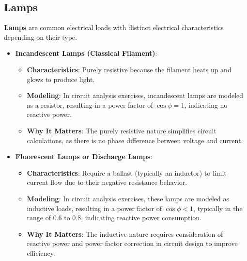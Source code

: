 \documentclass[12pt]{article}
\newcommand{\concept}[1]{\textbf{#1}}
\begin{document}
\subsection{Lamps}
\concept{Lamps} are common electrical loads with distinct electrical characteristics depending on their type.
\begin{itemize}
    \item \textbf{Incandescent Lamps (Classical Filament)}:
        \begin{itemize}
            \item \textbf{Characteristics}: Purely resistive because the filament heats up and glows to produce light.
            \item \textbf{Modeling}: In circuit analysis exercises, incandescent lamps are modeled as a resistor, resulting in a power factor of \(\cos \phi = 1\), indicating no reactive power.
            \item \textbf{Why It Matters}: The purely resistive nature simplifies circuit calculations, as there is no phase difference between voltage and current.
        \end{itemize}
    \item \textbf{Fluorescent Lamps or Discharge Lamps}:
        \begin{itemize}
            \item \textbf{Characteristics}: Require a ballast (typically an inductor) to limit current flow due to their negative resistance behavior.
            \item \textbf{Modeling}: In circuit analysis exercises, these lamps are modeled as inductive loads, resulting in a power factor of \(\cos \phi < 1\), typically in the range of 0.6 to 0.8, indicating reactive power consumption.
            \item \textbf{Why It Matters}: The inductive nature requires consideration of reactive power and power factor correction in circuit design to improve efficiency.
        \end{itemize}
\end{itemize}
\end{document}
